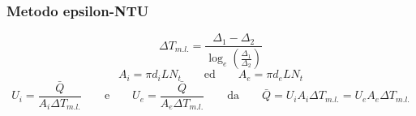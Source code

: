 \documentclass[a4paper,10pt]{article}                                                                                       %
\begin{document}
\subsubsection{Metodo epsilon-NTU}                                                                                          %
\label{subsubsec:ecf_epsilon_nut}                                                                                           %
\begin{equation}                                                                                                            %
  \Delta{T_{m.l.}} = \frac{\Delta_{1}-\Delta_{2}}{\log_e{(\frac{\Delta_{1}}{\Delta_{2}})}}                                  %
  \label{eqn:deltatml}                                                                                                      %
\end{equation}                                                                                                              %
\begin{equation}                                                                                                            %
  A_i = \pi d_iLN_t                                                                                                         %
  \qquad\text{ed}\qquad                                                                                                     %
  A_e = \pi d_eLN_t                                                                                                         %
  \label{eqn:surf}                                                                                                          %
\end{equation}                                                                                                              %
\begin{equation}                                                                                                            %
  U_i = \frac{\bar{Q}}{A_i\Delta{T_{m.l.}}}                                                                                 %
  \qquad\text{e}\qquad                                                                                                      %
  U_e = \frac{\bar{Q}}{A_e\Delta{T_{m.l.}}}                                                                                 %
  \qquad\text{da}\qquad                                                                                                     %
  \bar{Q} = U_iA_i\Delta{T_{m.l.}} = U_eA_e\Delta{T_{m.l.}}                                                                 %
  \label{eqn:ghtc}                                                                                                          %
\end{equation}                                                                                                              %
\end{document}
